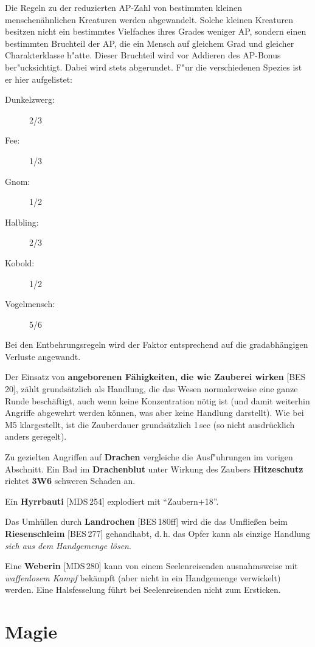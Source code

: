 \documentclass[10pt,a4paper,germanpar]{article}
\begin{document}
Die Regeln zu der reduzierten AP-Zahl von bestimmten kleinen
menschenähnlichen Kreaturen werden abgewandelt. Solche kleinen
Kreaturen besitzen nicht ein bestimmtes Vielfaches ihres Grades
weniger AP, sondern einen bestimmten Bruchteil der AP, die ein Mensch
auf gleichem Grad und gleicher Charakterklasse h"atte. Dieser
Bruchteil wird vor Addieren des AP-Bonus ber"ucksichtigt. Dabei wird
stets abgerundet. F"ur die verschiedenen Spezies ist er hier
aufgelistet:
\begin{description}
\item[Dunkelzwerg:] 2/3
\item[Fee:] 1/3
\item[Gnom:] 1/2
\item[Halbling:] 2/3
\item[Kobold:] 1/2
\item[Vogelmensch:] 5/6
\end{description}

Bei den Entbehrungsregeln wird der Faktor entsprechend auf die
gradabhängigen Verluste angewandt.

Der Einsatz von \textbf{angeborenen Fähigkeiten, die wie Zauberei
  wirken} [BES\,20], zählt grundsätzlich als Handlung, die das Wesen
normalerweise eine ganze Runde beschäftigt, auch wenn keine
Konzentration nötig ist (und damit weiterhin Angriffe abgewehrt werden
können, was aber keine Handlung darstellt). Wie bei M5 klargestellt,
ist die Zauberdauer grundsätzlich 1\,sec (so nicht ausdrücklich anders
geregelt).

Zu gezielten Angriffen auf \textbf{Drachen} vergleiche die
Ausf"uhrungen im vorigen Abschnitt. Ein Bad im \textbf{Drachenblut}
unter Wirkung des Zaubers \textbf{Hitzeschutz} richtet \textbf{3W6}
schweren Schaden an.

Ein \textbf{Hyrrbauti} [MDS\,254] explodiert mit "`Zaubern+18"'.

Das Umhüllen durch \textbf{Landrochen} [BES\,180ff] wird die das
Umfließen beim \textbf{Riesenschleim} [BES\,277] gehandhabt,
d.\,h. das Opfer kann als einzige Handlung \emph{sich aus dem
  Handgemenge lösen}.

Eine \textbf{Weberin} [MDS\,280] kann von einem Seelenreisenden
ausnahmsweise mit \emph{waffenlosem Kampf} bekämpft (aber nicht
in ein Handgemenge verwickelt) werden. Eine Halsfesselung führt bei
Seelenreisenden nicht zum Ersticken.

\section{Magie}
\end{document}
